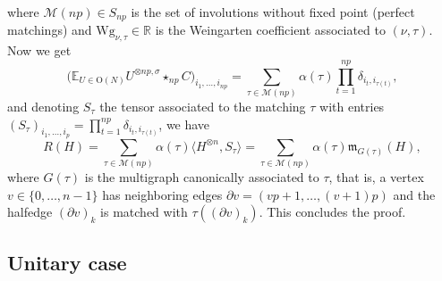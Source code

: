 \documentclass[pdftex]{sigma}
\numberwithin{equation}{section}
\theoremstyle{definition}
\begin{document}
where $\mathcal{M}(np) \in S_{np}$ is the set of involutions without fixed point (perfect matchings) and ${\mathrm{Wg}_{\nu,\tau} \in \mathbb{R}}$ is the Weingarten coefficient associated to $(\nu,\tau)$. Now we get
\[
\bigl(\mathbb{E}_{U \in \mathrm{O}(N)} U^{\otimes np, \sigma} \star_{np} C\bigr)_{i_1,\dots,i_{np}} = \sum_{\tau \in \mathcal{M}(np)} \alpha(\tau) \prod_{t=1}^{np} \delta_{i_t,i_{\tau(t)}},
\]
and denoting $S_{\tau}$ the tensor associated to the matching $\tau$ with entries $(S_{\tau})_{i_1,\dots,i_p}=\prod_{t=1}^{np} \delta_{i_t,i_{\tau(t)}}$, we have
\[
R(H) = \sum_{\tau \in \mathcal{M}(np)} \alpha(\tau) \big\langle H^{\otimes n}, S_\tau \big\rangle = \sum_{\tau \in \mathcal{M}(np)} \alpha(\tau) \mathfrak{m}_{G(\tau)}(H),
 \]
where $G(\tau)$ is the multigraph canonically associated to $\tau$, that is, a vertex $v \in \{ 0,\dots,n-1 \}$ has neighboring edges $\partial v =(vp+1,\dots,(v+1)p)$ and the halfedge $(\partial v)_k$ is matched with $\tau((\partial v)_k)$. This concludes the proof.

\subsection{Unitary case}
\end{document}
